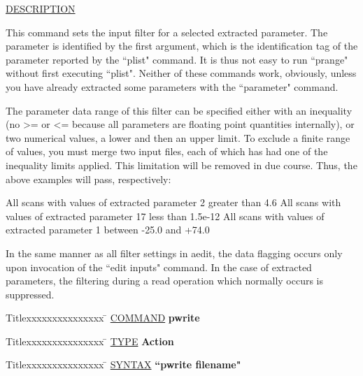 \underline{DESCRIPTION}
\begin{list}{}{\setlength{\leftmargin}{0.5in}
     \setlength{\rightmargin}{0in}}
\item
This command sets the input filter for a selected extracted parameter.  The
parameter is identified by the first argument, which is the identification tag
of the parameter reported by the ``plist" command.  It is thus not easy to run
``prange" without first executing ``plist".  Neither of these commands work,
obviously, unless you have already extracted some parameters with the
``parameter" command.
\item
The parameter data range of this filter can be specified either with an inequality
(no >= or <= because all parameters are floating point quantities internally),
or two numerical values, a lower and then an upper limit.  To exclude a finite
range of values, you must merge two input files, each of which has had one of
the inequality limits applied.  This limitation will be removed in due course.
Thus, the above examples will pass, respectively:
\item
All scans with values of extracted parameter 2 greater than 4.6
All scans with values of extracted parameter 17 less than 1.5e-12
All scans with values of extracted parameter 1 between -25.0 and +74.0
\item
In the same manner as all filter settings in aedit, the data flagging occurs only
upon invocation of the ``edit inputs" command.  In the case of extracted
parameters, the filtering during a read operation which normally occurs is
suppressed.
\end{list}
\vspace{.2in}

\begin{tabbing}
Titlexxxxxxxxxxxxxxx \= \kill
\underline{COMMAND} \> {\bf 	pwrite} \\
\end{tabbing}

\begin{tabbing}
Titlexxxxxxxxxxxxxxx \= \kill
\underline{TYPE} \> {\bf 		Action} \\
\end{tabbing}

\begin{tabbing}
Titlexxxxxxxxxxxxxxx \= \kill
\underline{SYNTAX} \> {\bf 		``pwrite filename"} \\
\end{tabbing}

